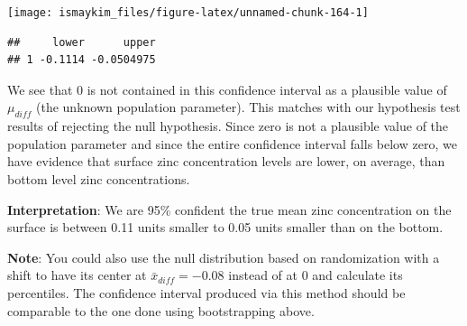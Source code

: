 \documentclass[]{tufte-book}
\newenvironment{Shaded}{\begin{snugshade}}{\end{snugshade}}
\newcommand{\KeywordTok}[1]{\textcolor[rgb]{0.13,0.29,0.53}{\textbf{{#1}}}}
\newcommand{\DataTypeTok}[1]{\textcolor[rgb]{0.13,0.29,0.53}{{#1}}}
\newcommand{\DecValTok}[1]{\textcolor[rgb]{0.00,0.00,0.81}{{#1}}}
\newcommand{\FloatTok}[1]{\textcolor[rgb]{0.00,0.00,0.81}{{#1}}}
\newcommand{\StringTok}[1]{\textcolor[rgb]{0.31,0.60,0.02}{{#1}}}
\newcommand{\NormalTok}[1]{{#1}}
\begin{document}
\begin{Shaded}
\end{Shaded}

\begin{center}\texttt{[image: ismaykim\_files/figure-latex/unnamed-chunk-164-1]} \end{center}

\begin{Shaded}
\end{Shaded}

\begin{verbatim}
##     lower      upper
## 1 -0.1114 -0.0504975
\end{verbatim}

We see that 0 is not contained in this confidence interval as a
plausible value of \(\mu_{diff}\) (the unknown population parameter).
This matches with our hypothesis test results of rejecting the null
hypothesis. Since zero is not a plausible value of the population
parameter and since the entire confidence interval falls below zero, we
have evidence that surface zinc concentration levels are lower, on
average, than bottom level zinc concentrations.

\textbf{Interpretation}: We are 95\% confident the true mean zinc
concentration on the surface is between 0.11 units smaller to 0.05 units
smaller than on the bottom.

\textbf{Note}: You could also use the null distribution based on
randomization with a shift to have its center at
\(\bar{x}_{diff} = -0.08\) instead of at 0 and calculate its
percentiles. The confidence interval produced via this method should be
comparable to the one done using bootstrapping above.
\end{document}
